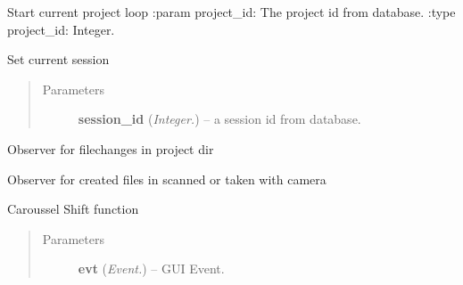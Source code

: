 \documentclass[letterpaper,10pt,english]{sphinxmanual}
\begin{document}
\begin{fulllineitems}
\begin{fulllineitems}
\end{fulllineitems}


\begin{fulllineitems}
\label{api:wos.GUI.SetCurrentProject}
Start current project loop 
:param project\_id: The project id from database.
:type project\_id: Integer.

\end{fulllineitems}


\begin{fulllineitems}
\label{api:wos.GUI.SetCurrentSession}
Set current session
\begin{quote}\begin{description}
\item[{Parameters}] \leavevmode
\textbf{session\_id} (\emph{Integer.}) -- a session id from database.

\end{description}\end{quote}

\end{fulllineitems}


\begin{fulllineitems}
\label{api:wos.GUI.SetProjectObserver}
Observer for filechanges in project dir

\end{fulllineitems}


\begin{fulllineitems}
\label{api:wos.GUI.SetScanObserver}
Observer for created files in scanned or taken with camera

\end{fulllineitems}


\begin{fulllineitems}
\label{api:wos.GUI.Shift}
Caroussel Shift function
\begin{quote}\begin{description}
\item[{Parameters}] \leavevmode
\textbf{evt} (\emph{Event.}) -- GUI Event.


\end{description}
\end{quote}
\end{fulllineitems}
\end{fulllineitems}
\end{document}
